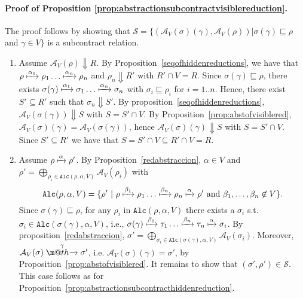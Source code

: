 \documentclass[submission,copyright,creativecommons]{eptcs}
\makeatletter
\newcommand{\tr}[1]{\stackrel{#1}{\rightarrowfill}}
\def \rightarrowfill{\m@th\mathord{\smash-}\mkern-6mu\cleaders\hbox{$\mkern-2mu\mathord{\smash-}\mkern-2mu$}\hfill
  \mkern-6mu\mathord\rightarrow}
\makeatother
\begin{document}
\paragraph{Proof of Proposition \ref{prop:abstractionsubcontractvisiblereduction}.}
The proof follows by showing that $\mathcal{S}= \{(\mathcal{A}_V(\sigma)(\gamma),\mathcal{A}_V(\rho)) | \sigma(\gamma) \sqsubseteq \rho$ and $\gamma\in V\}$ 
is a subcontract relation. 
\begin{enumerate}
 \item Assume $\mathcal{A}_V(\rho) \Downarrow R$. By Proposition~\ref{seqofhiddenreductions}, we have that
 $\rho\xmapsto{\alpha_1}\rho_1\ldots\xmapsto{\alpha_n}\rho_n$ and $\rho_n\Downarrow R'$ with $R'\cap V = R$.
 Since  $\sigma(\gamma) \sqsubseteq \rho$, there exists 
 $\sigma(\gamma)\xmapsto{\alpha_1}\sigma_1\ldots\xmapsto{\alpha_n}\sigma_n$ with $\sigma_i \sqsubseteq \rho_i$ for $i= 1..n$.
 Hence, there exist $S'\subseteq R'$ such that $\sigma_n\Downarrow S'$. By proposition~\ref{seqofhiddenreductions},
 $\mathcal{A}_V(\sigma(\gamma)) \Downarrow S$ with $S=S'\cap V$. By Proposition~\ref{prop:abstofvisiblered},  $\mathcal{A}_V(\sigma)(\gamma) = \mathcal{A}_V(\sigma(\gamma))$, hence  $\mathcal{A}_V(\sigma)(\gamma) \Downarrow S$ with $S=S'\cap V$. Since $S'\subseteq R'$ we have that $S = S'\cap V \subseteq R'\cap V = R$.
 
 \item Assume $\rho\xmapsto{\alpha}\rho'$. By Proposition~\ref{redabstraccion},   
  $\alpha\in V$ and $\rho' = \bigoplus_{\rho_i\in \mathtt{Alc}(\rho,\alpha,V)} \mathcal{A}_V(\rho_i)$ with
 \[\mathtt{Alc}(\rho,\alpha,V) = \{\rho'\ |\ \rho\xmapsto{\beta_1}\rho_1\ldots\xmapsto{\beta_n}\rho_n\xmapsto{\alpha}\rho'\ \mbox{and}\ \beta_1,\ldots,\beta_n\not\in V\}.\] 
 Since $\sigma(\gamma) \sqsubseteq \rho$, for any $\rho_i$ in $\mathtt{Alc}(\rho,\alpha,V)$ there exists 
 a $\sigma_i$ s.t. $\sigma_i\in\mathtt{Alc}(\sigma(\gamma),\alpha,V)$, i.e., $\sigma(\gamma)\xmapsto{\beta_1}\tau_1\ldots\xmapsto{\beta_n}\tau_n\xmapsto{\alpha}\sigma_i$. 
  By proposition~\ref{redabstraccion},
 $\sigma'= \bigoplus_{\sigma_i\in\mathtt{Alc}(\sigma(\gamma),\alpha,V)} \mathcal{A}_V(\sigma_i)$. Moreover, $\mathcal{A}_V(\sigma)\tr{\gamma}\sigma'$, i.e. $\mathcal{A}_V(\sigma)(\gamma) = \sigma'$,
 by Proposition~\ref{prop:abstofvisiblered}.
 It remains to show that $(\sigma', \rho')\in \mathcal{S}$. This case follows as for Proposition~\ref{prop:abstractionsubcontracthiddenreduction}.
\end{enumerate}
\end{document}
